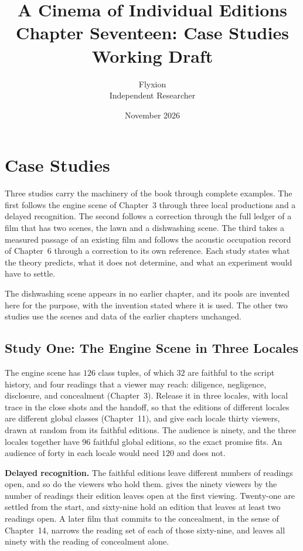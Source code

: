 \documentclass[11pt,twoside,openright]{book}
\title{\Huge\bfseries A Cinema of Individual Editions\\[1.2ex]
\large Chapter Seventeen: Case Studies\\[0.4ex]
\large Working Draft}
\author{Flyxion\\[0.3ex]\small Independent Researcher}
\date{November 2026}
\theoremstyle{plain}
\theoremstyle{definition}
\theoremstyle{remark}
\begin{document}
\frontmatter
\maketitle
\tableofcontents
\mainmatter
\setcounter{chapter}{16}

\chapter{Case Studies}
\label{ch:cases}

Three studies carry the machinery of the book through complete examples. The first follows the engine scene of Chapter~3 through three local productions and a delayed recognition. The second follows a correction through the full ledger of a film that has two scenes, the lawn and a dishwashing scene. The third takes a measured passage of an existing film and follows the acoustic occupation record of Chapter~6 through a correction to its own reference. Each study states what the theory predicts, what it does not determine, and what an experiment would have to settle.

The dishwashing scene appears in no earlier chapter, and its pools are invented here for the purpose, with the invention stated where it is used. The other two studies use the scenes and data of the earlier chapters unchanged.

\section{Study One: The Engine Scene in Three Locales}\label{sec:engine17}

The engine scene has $126$ class tuples, of which $32$ are faithful to the script history, and four readings that a viewer may reach: diligence, negligence, disclosure, and concealment (Chapter~3). Release it in three locales, with local trace in the close shots and the handoff, so that the editions of different locales are different global classes (Chapter~11), and give each locale thirty viewers, drawn at random from its faithful editions. The audience is ninety, and the three locales together have $96$ faithful global editions, so the exact promise fits. An audience of forty in each locale would need $120$ and does not.

\textbf{Delayed recognition.} The faithful editions leave different numbers of readings open, and so do the viewers who hold them.  gives the ninety viewers by the number of readings their edition leaves open at the first viewing. Twenty-one are settled from the start, and sixty-nine hold an edition that leaves at least two readings open. A later film that commits to the concealment, in the sense of Chapter~14, narrows the reading set of each of those sixty-nine, and leaves all ninety with the reading of concealment alone.
\end{document}

